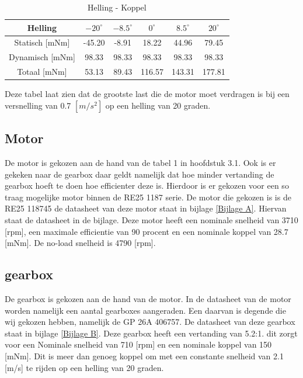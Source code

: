 \documentclass{article}
\begin{document}
        \begin{table}[h]
            \centering
            \begin{tabular}{|c|c|c|c|c|c|}
            \hline
            Helling & $-20 ^\circ$ & $-8.5 ^\circ$ & $0 ^\circ$ & $8.5 ^\circ$ & $20 ^\circ$ \\ \hline
            Statisch [mNm]  & -45.20   & -8.91   & 18.22   & 44.96  & 79.45   \\ \hline
            Dynamisch [mNm] & 98.33    & 98.33   & 98.33   & 98.33  & 98.33  \\ \hline
            Totaal [mNm] & 53.13  & 89.43   & 116.57  & 143.31  & 177.81  \\ \hline
            \end{tabular}
            \caption{Helling - Koppel}
            \label{tab}
        \end{table}
    
    Deze tabel laat zien dat de grootste last die de motor moet verdragen is bij  een versnelling van 0.7 $[m/s^2]$ op een helling van 20 graden.
        
    \subsection{Motor}
    De motor is gekozen aan de hand van de tabel 1 in hoofdstuk 3.1. 
    Ook is er gekeken naar de gearbox daar geldt namelijk dat hoe minder vertanding de gearbox hoeft te doen hoe efficienter deze is. 
    Hierdoor is er gekozen voor een so traag mogelijke motor binnen de RE25 1187 serie.
    De motor die gekozen is is de RE25 118745 de datasheet van deze motor staat in bijlage \ref{Bijlage A}.
    Hiervan staat de datasheet in de bijlage.
    Deze motor heeft een nominale snelheid van 3710 [rpm], een maximale efficientie van 90 procent en een nominale koppel van 28.7 [mNm].
    De no-load snelheid is 4790 [rpm].
    

    \subsection{gearbox}
    De gearbox is gekozen aan de hand van de motor. 
    In de datasheet van de motor worden namelijk een aantal gearboxes aangeraden.
    Een daarvan is degende die wij gekozen hebben, namelijk de GP 26A 406757. 
    De datasheet van deze gearbox staat in bijlage \ref{Bijlage B}.
    Deze gearbox heeft een vertanding van 5.2:1. dit zorgt voor een Nominale snelheid van 710 [rpm] en een nominale koppel van 150 [mNm]. 
    Dit is meer dan genoeg koppel om met een constante snelheid van 2.1 [m/s] te rijden op een helling van 20 graden.
\end{document}

